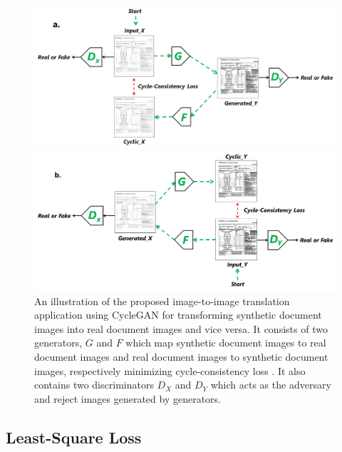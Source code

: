 \begin{figure}[H]
  \centering
  \begin{minipage}[b]{1.1\textwidth}
    \includegraphics[width=\textwidth]{images/Methodology/Gxy.png}
  \end{minipage}
  \vfill
  \begin{minipage}[b]{1.1\textwidth}
    \includegraphics[width=\textwidth]{images/Methodology/Fyx.png}
  \end{minipage}
  \caption[An illustration of the proposed image-to-image translation application using \ac{CycleGAN} for transforming synthetic document images into real document images and vice versa.]{An illustration of the proposed image-to-image translation application using \ac{CycleGAN} for transforming synthetic document images into real document images and vice versa. It consists of two generators, $G$ and $F$ which map synthetic document images to real document images and real document images to synthetic document images, respectively minimizing cycle-consistency loss \cite{zhu2020unpaired}. It also contains two discriminators $D_X$ and $D_Y$ which acts as the adversary and reject images generated by generators.}
  \label{fig:GxyFyx}
\end{figure}

\subsection{Least-Square Loss}


